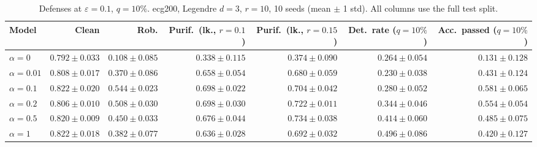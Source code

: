 \begin{table}[htbp]
  \centering
  \small
  \begin{tabular}{@{}lrrrrrr@{}}
    \toprule
    Model & Clean & Rob. & Purif.\ (lk., $r{=}0.1$) & Purif.\ (lk., $r{=}0.15$) & Det.\ rate ($q{=}10\%$) & Acc.\ passed ($q{=}10\%$) \\
    \midrule
    $\alpha{=}0$ & $0.792 \pm 0.033$ & $0.108 \pm 0.085$ & $0.338 \pm 0.115$ & $0.374 \pm 0.090$ & $0.264 \pm 0.054$ & $0.131 \pm 0.128$ \\
    $\alpha{=}0.01$ & $0.808 \pm 0.017$ & $0.370 \pm 0.086$ & $0.658 \pm 0.054$ & $0.680 \pm 0.059$ & $0.230 \pm 0.038$ & $0.431 \pm 0.124$ \\
    $\alpha{=}0.1$ & $0.822 \pm 0.020$ & $\mathbf{0.544 \pm 0.023}$ & $0.698 \pm 0.022$ & $0.704 \pm 0.042$ & $0.280 \pm 0.052$ & $\mathbf{0.581 \pm 0.065}$ \\
    $\alpha{=}0.2$ & $0.806 \pm 0.010$ & $0.508 \pm 0.030$ & $\mathbf{0.698 \pm 0.030}$ & $0.722 \pm 0.011$ & $0.344 \pm 0.046$ & $0.554 \pm 0.054$ \\
    $\alpha{=}0.5$ & $0.820 \pm 0.009$ & $0.450 \pm 0.033$ & $0.676 \pm 0.044$ & $\mathbf{0.734 \pm 0.038}$ & $0.414 \pm 0.060$ & $0.485 \pm 0.075$ \\
    $\alpha{=}1$ & $\mathbf{0.822 \pm 0.018}$ & $0.382 \pm 0.077$ & $0.636 \pm 0.028$ & $0.692 \pm 0.032$ & $\mathbf{0.496 \pm 0.086}$ & $0.420 \pm 0.127$ \\
    \bottomrule
  \end{tabular}
  \caption{Defenses at $\varepsilon=0.1$, $q{=}10\%$. ecg200, Legendre $d{=}3$, $r{=}10$, 10 seeds (mean $\pm$ 1 std). All columns use the full test split.}
  \label{tab:ecg200_models_r10_eps0.1}
\end{table}
